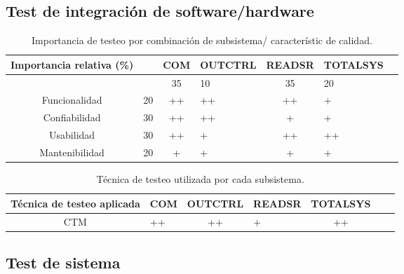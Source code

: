 \documentclass[
11pt, %
]{charter}
\begin{document}
\subsection{Test de integración de software/hardware}
\begin{table}[ht]
    \centering
    \begin{tabularx}{\linewidth}{@{}|c|X|c|X|c|X|c|@{}}\hline \hline
    \rowcolor[HTML]{d6c6c3}
 Importancia relativa (\%)& &  COM & OUTCTRL & READSR & TOTALSYS\\
        \hline
       
         &  &35 & 10 &35 & 20                          \\
        Funcionalidad    & 20 & ++ & ++ & ++ & +		\\
        Confiabilidad    & 30 & ++ & ++ & +& +                        \\
        Usabilidad       & 30 & ++ & + & ++ & ++                        \\
        Mantenibilidad   & 20 & + & + & + & +                        \\
        \hline
    \end{tabularx}
    \caption{Importancia de testeo por combinación de subsistema/ característic de calidad.}
\end{table}


\begin{table}[ht]
    \centering
    \begin{tabularx}{\linewidth}{@{}|c|X|c|X|c|X|c|@{}}\hline \hline
    \rowcolor[HTML]{d6c6c3}
 Técnica de testeo aplicada & COM & OUTCTRL & READSR & TOTALSYS\\
        \hline
       CTM & ++ & ++ & + & ++ \\
        \hline
    \end{tabularx}
    \caption{Técnica de testeo utilizada por cada subsistema.}
\end{table}


\subsection{Test de sistema}
\end{document}
